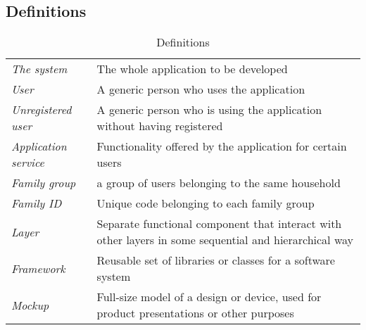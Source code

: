 \newpage
\subsection{Definitions}
\begin{center}
\setlength\tabcolsep{7pt}
\renewcommand{\arraystretch}{2}
\begin{longtable}{|m{3.2cm}|m{8.3cm}|}
\caption{Definitions}\\
\hline
\endfirsthead
\endhead
\hline
\endlastfoot
\textit{The system} & The whole application to be developed \\
\textit{User} & A generic person who uses the application\\
\textit{Unregistered user} & A generic person who is using the application without having registered \\
\textit{Application service} & Functionality offered by the application for certain users \\
\textit{Family group} & a group of users belonging to the same household  \\
\textit{Family ID} & Unique code belonging to each family group \\
\textit{Layer} & Separate functional component that interact with other layers in some sequential and hierarchical way\\
\textit{Framework} & Reusable set of libraries or classes for a software system\\
\textit{Mockup} & Full-size model of a design or device, used for product presentations or other purposes\\
\end{longtable}
\end{center}